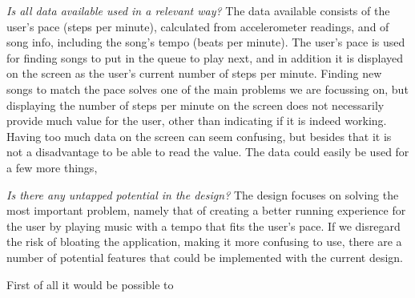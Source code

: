 \textit{Is all data available used in a relevant way?}
The data available consists of the user's pace (steps per minute), calculated from accelerometer readings, and of song info, including the song's tempo (beats per minute).
The user's pace is used for finding songs to put in the queue to play next, and in addition it is displayed on the screen as the user's current number of steps per minute.
Finding new songs to match the pace solves one of the main problems we are focussing on, but displaying the number of steps per minute on the screen does not necessarily provide much value for the user, other than indicating if it is indeed working.
Having too much data on the screen can seem confusing, but besides that it is not a disadvantage to be able to read the value.
The data could easily be used for a few more things,


\textit{Is there any untapped potential in the design?}
The design focuses on solving the most important problem, namely that of creating a better running experience for the user by playing music with a tempo that fits the user's pace.
If we disregard the risk of bloating the application, making it more confusing to use, there are a number of potential features that could be implemented with the current design.

First of all it would be possible to










